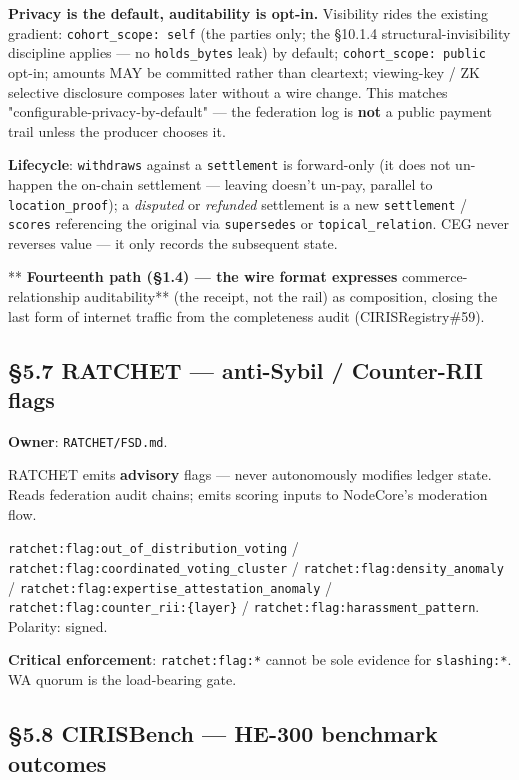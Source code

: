 \documentclass[11pt]{article}
\begin{document}
\textbf{Privacy is the default, auditability is opt-in.} Visibility rides the existing gradient: \texttt{cohort\_scope: self} (the parties only; the §10.1.4 structural-invisibility discipline applies — no \texttt{holds\_bytes} leak) by default; \texttt{cohort\_scope: public} opt-in; amounts MAY be committed rather than cleartext; viewing-key / ZK selective disclosure composes later without a wire change. This matches "configurable-privacy-by-default" — the federation log is \textbf{not} a public payment trail unless the producer chooses it.


\textbf{Lifecycle}: \texttt{withdraws} against a \texttt{settlement} is forward-only (it does not un-happen the on-chain settlement — leaving doesn't un-pay, parallel to \texttt{location\_proof}); a \textit{disputed} or \textit{refunded} settlement is a new \texttt{settlement} / \texttt{scores} referencing the original via \texttt{supersedes} or \texttt{topical\_relation}. CEG never reverses value — it only records the subsequent state.


**\textbf{ Fourteenth path (§1.4) — the wire format expresses }commerce-relationship auditability** (the receipt, not the rail) as composition, closing the last form of internet traffic from the completeness audit (CIRISRegistry\#59).


\subsection*{§5.7 RATCHET — anti-Sybil / Counter-RII flags}


\textbf{Owner}: \texttt{RATCHET/FSD.md}.


RATCHET emits \textbf{advisory} flags — never autonomously modifies ledger state. Reads federation audit chains; emits scoring inputs to NodeCore's moderation flow.


\texttt{ratchet:flag:out\_of\_distribution\_voting} / \texttt{ratchet:flag:coordinated\_voting\_cluster} / \texttt{ratchet:flag:density\_anomaly} / \texttt{ratchet:flag:expertise\_attestation\_anomaly} / \texttt{ratchet:flag:counter\_rii:\{layer\}} / \texttt{ratchet:flag:harassment\_pattern}. Polarity: signed.


\textbf{Critical enforcement}: \texttt{ratchet:flag:*} cannot be sole evidence for \texttt{slashing:*}. WA quorum is the load-bearing gate.


\subsection*{§5.8 CIRISBench — HE-300 benchmark outcomes}
\end{document}
